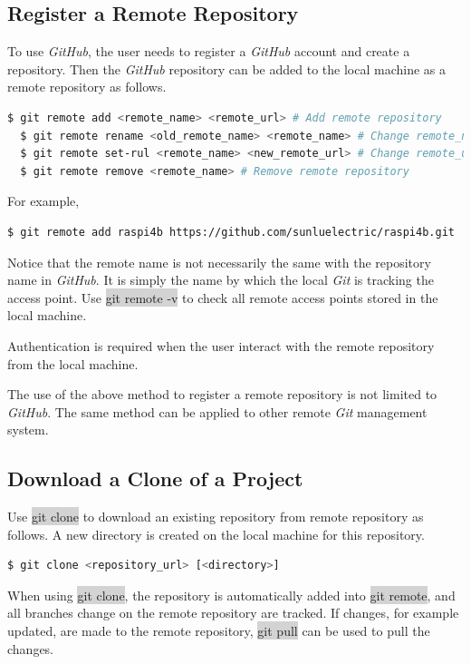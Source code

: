 \documentclass[a4paper]{article}
\begin{document}
\subsection{Register a Remote Repository}

To use \textit{GitHub}, the user needs to register a \textit{GitHub} account and create a repository. Then the \textit{GitHub} repository can be added to the local machine as a remote repository as follows.
\begin{lstlisting}[backgroundcolor = \color{lightgray},language=bash]
  $ git remote add <remote_name> <remote_url> # Add remote repository
  $ git remote rename <old_remote_name> <remote_name> # Change remote_name
  $ git remote set-rul <remote_name> <new_remote_url> # Change remote_url
  $ git remote remove <remote_name> # Remove remote repository
\end{lstlisting}
For example,
\begin{lstlisting}[backgroundcolor = \color{lightgray},language=bash]
  $ git remote add raspi4b https://github.com/sunluelectric/raspi4b.git
\end{lstlisting}

Notice that the remote name is not necessarily the same with the repository name in \textit{GitHub}. It is simply the name by which the local \textit{Git} is tracking the access point. Use \colorbox{lightgray}{git remote -v} to check all remote access points stored in the local machine.

Authentication is required when the user interact with the remote repository from the local machine.

The use of the above method to register a remote repository is not limited to \textit{GitHub}. The same method can be applied to other remote \textit{Git} management system.

\subsection{Download a Clone of a Project}

Use \colorbox{lightgray}{git clone} to download an existing repository from remote repository as follows. A new directory is created on the local machine for this repository.
\begin{lstlisting}[backgroundcolor = \color{lightgray},language=bash]
  $ git clone <repository_url> [<directory>]
\end{lstlisting}

When using \colorbox{lightgray}{git clone}, the repository is automatically added into \colorbox{lightgray}{git remote}, and all branches change on the remote repository are tracked. If changes, for example updated, are made to the remote repository, \colorbox{lightgray}{git pull} can be used to pull the changes.
\end{document}
